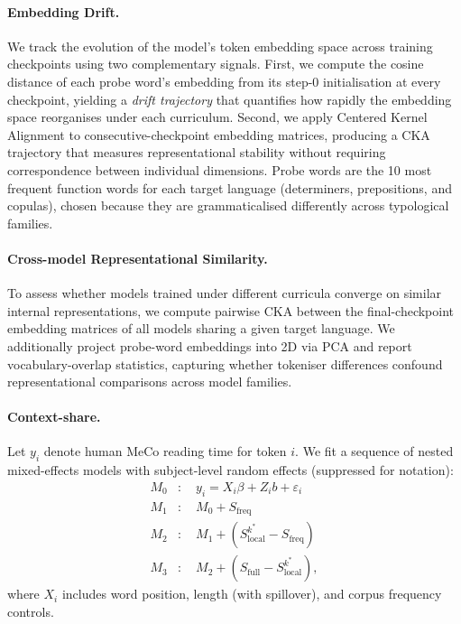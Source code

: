 \documentclass[11pt]{article}
\begin{document}
\paragraph{Embedding Drift.}
We track the evolution of the model's token embedding space across training checkpoints using two complementary signals. First, we compute the cosine distance of each probe word's embedding from its step-0 initialisation at every checkpoint, yielding a \emph{drift trajectory} that quantifies how rapidly the embedding space reorganises under each curriculum. Second, we apply Centered Kernel Alignment \citep[CKA;][]{kornblith-etal-2019-cka} to consecutive-checkpoint embedding matrices, producing a CKA trajectory that measures representational stability without requiring correspondence between individual dimensions. Probe words are the 10 most frequent function words for each target language (determiners, prepositions, and copulas), chosen because they are grammaticalised differently across typological families.

\paragraph{Cross-model Representational Similarity.}
To assess whether models trained under different curricula converge on similar internal representations, we compute pairwise CKA between the final-checkpoint embedding matrices of all models sharing a given target language. We additionally project probe-word embeddings into 2D via PCA and report vocabulary-overlap statistics, capturing whether tokeniser differences confound representational comparisons across model families.


\paragraph{Context-share.}
Let $y_i$ denote human MeCo reading time for token $i$. We fit a sequence of nested mixed-effects models with subject-level random effects (suppressed for notation):
\begin{align*}
M_0 &: \quad y_i = X_i \beta + Z_i b + \varepsilon_i \\
M_1 &: \quad M_0 + S_{\text{freq}} \\
M_2 &: \quad M_1 + \left(S_{\text{local}}^{k^*} - S_{\text{freq}}\right) \\
M_3 &: \quad M_2 + \left(S_{\text{full}} - S_{\text{local}}^{k^*}\right),
\end{align*}
where $X_i$ includes word position, length (with spillover), and corpus frequency controls.
\end{document}
